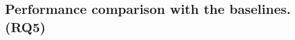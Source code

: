 \documentclass[conference]{IEEEtran}
\begin{document}
\subsection{Performance comparison with the baselines. (RQ5)}
% 
\end{document}
